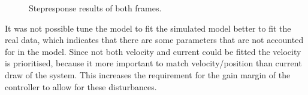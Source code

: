 \documentclass[../../main]{subfiles}
\begin{document}
\begin{figure}[H]
        \centering
				\def\svgwidth{0.47\columnwidth}
				\def\svgwidth{0.47\columnwidth}
				\caption{Stepresponse results of both frames.}
				\label{fig:validation_steptuning}
\end{figure}

It was not possible tune the model to fit the simulated model better to fit the real data, 
which indicates that there are some parameters that are not accounted for in the model.
Since not both velocity and current could be fitted the velocity is prioritised,
because it more important to match velocity/position than current draw of the system.
This increases the requirement for the gain margin of the controller to allow for these disturbances.
\end{document}
